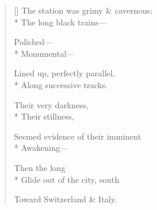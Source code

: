 \label{ch:gare_du_lyon}
\settowidth{\versewidth}{The station was grimy \& cavernous:}
\begin{verse}[\versewidth]
The station was grimy \& cavernous:\\*
The long black trains---

Polished---\\*
Monumental---

Lined up, perfectly parallel,\\*
Along successive tracks.

Their very darkness,\\*
Their stillness,

Seemed evidence of their imminent\\*
Awakening---

Then the long\\*
Glide out of the city, south

Toward Switzerland \& Italy.
\end{verse}
